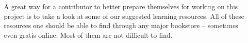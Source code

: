 

A great way for a contributor to better prepare themselves for working on this project is to take a look at some of our suggested learning resources. All of these resources one should be able to find through any major bookstore -- sometimes even gratis online. Most of them are not difficult to find.


%



\StopChapter


